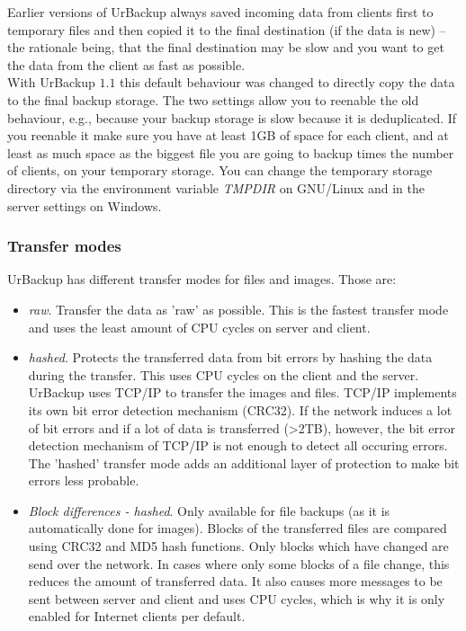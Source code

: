 \documentclass[a4paper,10pt]{article}
\begin{document}
Earlier versions of UrBackup always saved incoming data from clients first to temporary
files and then copied it to the final destination (if the data is new) -- the rationale
being, that the final destination may be slow and you want to get the data from the client
as fast as possible.\\
With UrBackup $1.1$ this default behaviour was changed to directly copy the data to the
final backup storage. The two settings allow you to reenable the old behaviour, e.g.,
because your backup storage is slow because it is deduplicated. If you reenable it
make sure you have at least 1GB of space for each client, and at least as much space as
the biggest file you are going to backup times the number of clients, on your temporary
storage. You can change the temporary storage directory via the environment variable \textsl{TMPDIR} on GNU/Linux and in the server settings on Windows.

\subsubsection{Transfer modes}

UrBackup has different transfer modes for files and images. Those are:

\begin{itemize}
  \item \textsl{raw}. Transfer the data as 'raw' as possible. This is the fastest transfer
  		mode and uses the least amount of CPU cycles on server and client.
  \item \textsl{hashed}. Protects the transferred data from bit errors by hashing the data
  		during the transfer. This uses CPU cycles on the client and the server.\\
  		UrBackup uses TCP/IP to transfer the images and files. TCP/IP implements its own
  		bit error detection mechanism (CRC32). If the network induces a lot of bit errors
  		and if a lot of data is transferred (>2TB), however, the bit error detection mechanism
  		of TCP/IP is not enough to detect all occuring errors. The 'hashed' transfer mode
  		adds an additional layer of protection to make bit errors less probable.
  \item \textsl{Block differences - hashed}. Only available for file backups (as it is
  		automatically done for images). Blocks of the transferred files are compared using
  		CRC32 and MD5 hash functions. Only blocks which have changed are send over the
  		network. In cases where only some blocks of a file change, this reduces the amount
  		of transferred data. It also causes more messages to be sent between server and
  		client and uses CPU cycles, which is why it is only enabled for Internet clients
  		per default. 
\end{itemize}
\end{document}
